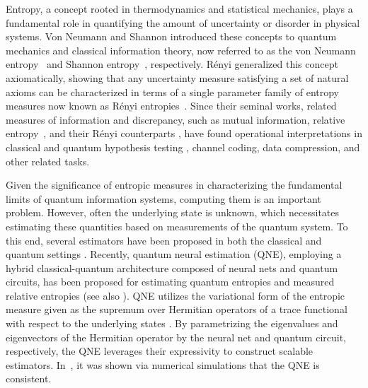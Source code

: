 \documentclass[a4paper,onecolumn,11pt,accepted=2026-05-12]{quantumarticle}
\begin{document}
Entropy, a concept rooted in thermodynamics and statistical mechanics, plays a fundamental role in quantifying the amount of uncertainty or disorder in physical systems. Von Neumann and Shannon introduced these concepts to  quantum mechanics and classical  information theory, now referred to as the von Neumann entropy~\cite{NeumannThermodynamikGesamtheiten} and Shannon entropy~\cite{Shannon1948ACommunication}, respectively. R\'{e}nyi generalized this concept axiomatically, showing that any uncertainty measure satisfying a set of natural axioms can be characterized in terms of a single parameter family of entropy measures now known as R\'{e}nyi entropies~\cite{Renyi1961OnInformation}. Since their seminal works, related measures of information and discrepancy, such as mutual information, relative entropy~\cite{Kullback1951OnSufficiency,U62}, and their R\'{e}nyi counterparts \cite{Petz1985Quasi-entropiesAlgebra,Petz1986Quasi-entropiesSystems,muller2013quantum,wilde2014strong}, have found operational interpretations in classical and quantum hypothesis testing \cite{Petz1985Quasi-entropiesAlgebra,ogawa-nagaoka-2000,ogawa-hayashi-2004,Nussbaum-Szkola-2006,Audenaert-2008,BBH-2021}, channel coding, data compression, and other related tasks. 

Given the significance of entropic measures in characterizing the fundamental limits of quantum information systems, computing them is an important problem. However, often the underlying state is unknown, which necessitates estimating these quantities based on measurements of the quantum system. To this end, several estimators have been proposed in both the classical and quantum settings \cite{Li2017QuantumEstimation,Subasi2019EntanglementCircuit,AISW-2020, Subramanian2019QuantumStates,Gilyen2019DistributionalWorld,Gur2021SublinearEntropy, Wang2022QuantumEntropies,Wang2022NewDistances,Gilyen2022ImprovedEstimation,Wang2022QuantumSystems,
 Wang2023QuantumEstimation,Wang-Zhang-Li-2024,Wang-Zhang-2025,lu2025estimatingquantumrelativeentropies}. Recently,  quantum neural estimation (QNE), 
employing a hybrid classical-quantum architecture composed of neural nets and quantum circuits, has been proposed for estimating  quantum entropies and measured relative entropies \cite{QNE-24} (see also \cite{Shin2024,lee2023estimating}). QNE utilizes the variational form of the entropic measure given as the supremum over Hermitian operators of a trace functional with respect to the underlying states \cite{Petz1988,petz2007quantum,Berta2015OnEntropies}. By parametrizing the eigenvalues and eigenvectors of the Hermitian operator by the neural net and quantum circuit, respectively,  the QNE leverages their expressivity to construct scalable  estimators. 
In~\cite{QNE-24}, it was shown via numerical simulations that the QNE is consistent.
\end{document}
